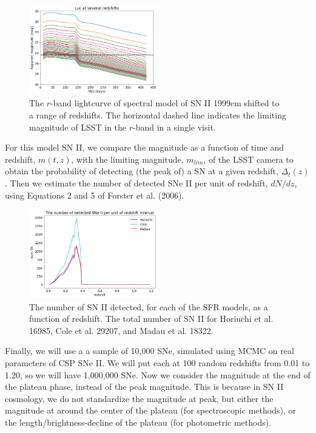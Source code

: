 \documentclass[12pt, onecolumn]{emulateapj}
\begin{document}
\begin{figure}
	\begin{center}
		\includegraphics[width=0.5\textwidth]{SNII_lc_withz.png}
		\caption{The $r$-band lightcurve of spectral model of SN II 1999em shifted to a range of redshifts. The horizontal dashed line indicates the limiting magnitude of LSST in the $r$-band in a single visit.}
		\label{fig:SNII_lc_wz}
	\end{center}
\end{figure}

For this model SN II, we compare the magnitude as a function of time and redshift, $m(t,z)$, with the limiting magnitude, $m_{lim}$, of the LSST camera to obtain the probability of detecting (the peak of) a SN at a given redshift, $\Delta_{t}(z)$. Then we estimate the number of detected SNe II per unit of redshift, $dN/dz$, using Equations 2 and 5 of Forster et al. (2006).

\begin{figure}
	\begin{center}
		\includegraphics[width=0.5\textwidth]{number_SNII.png}
		\caption{The number of SN II detected, for each of the SFR models, as a function of redshift. The total number of SN II for Horiuchi et al. 16985, Cole et al. 29207, and Madau et al.  18322. }
		\label{fig:SNII_lc_wz}
	\end{center}
\end{figure}

Finally, we will use a a sample of 10,000 SNe, simulated using MCMC on real parameters of CSP SNe II. We will put each at 100 random redshifts from 0.01 to 1.20, so we will have 1,000,000 SNe. Now we consider the magnitude at the end of the plateau phase, instead of the peak magnitude. This is because in SN II cosmology, we do not standardize the magnitude at peak, but either the magnitude at around the center of the plateau (for spectroscopic methods), or the length/brightness-decline of the plateau (for photometric methods).
\end{document}
